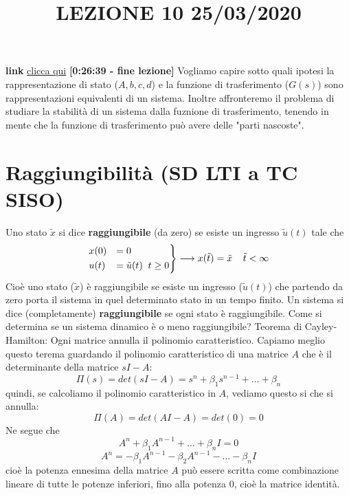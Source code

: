 \newpage
\title{LEZIONE 10 25/03/2020}\newline
\textbf{link} \href{https://web.microsoftstream.com/video/562a82e0-19cc-4f81-9183-eee77c9c45a4?list=user&userId=faa91214-a6f5-40d7-8875-253fd49b8ce1}{clicca qui} \;\;\textbf{[0:26:39 - fine lezione]}\newline
\newline
Vogliamo capire sotto quali ipotesi la rappresentazione di stato ($A, b, c, d$) e la funzione di trasferimento ($G(s)$) sono rappresentazioni equivalenti di un sistema. Inoltre affronteremo il problema di studiare la stabilità di un sistema dalla fuznione di trasferimento, tenendo in mente che la funzione di trasferimento può avere delle "parti nascoste".
\section{Raggiungibilità (SD LTI a TC SISO)}
Uno stato $\tilde{x}$ si dice \textbf{raggiungibile} (da zero) se esiste un ingresso $\tilde{u}(t)$ tale che 
\[
    \begin{rcases}
        x(0) &= 0 \\
        u(t) &= \tilde{u}(t) \;\; t \geq 0
    \end{rcases} \longrightarrow x(\tilde{t}) = \tilde{x}  \;\;\;\; \tilde{t}< \infty
\]
Cioè uno stato ($\tilde{x}$) è raggiungibile se esiste un ingresso ($\tilde{u}(t)$) che partendo da zero porta il sistema in quel determinato stato in un tempo finito.\newline
\newline
Un sistema si dice (completamente) \textbf{raggiungibile} se ogni stato è raggiungibile.\newline
\newline
Come si determina se un sistema dinamico è o meno raggiungibile?\newline
\newline
Teorema di Cayley-Hamilton: Ogni matrice annulla il polinomio caratteristico.\newline
Capiamo meglio questo terema guardando il polinomio caratteristico di una matrice $A$ che è il determinante della matrice $sI-A$:
\[
    \Pi(s) = det(sI-A) = s^n + \beta_1 s^{n-1} + \dots + \beta_n
\]
quindi, se calcoliamo il polinomio caratteristico in $A$, vediamo questo si che si annulla:
\[
    \Pi(A) = det(AI-A) = det(0) = 0
\]
Ne segue che
\[
    A^n + \beta_1 A^{n-1} + \dots + \beta_n I = 0
\]
\[
    A^n = -\beta_1 A^{n-1} - \beta_2 A^{n-1} - \dots - \beta_n I
\]
cioè la potenza ennesima della matrice $A$ può essere scritta come combinazione lineare di tutte le potenze inferiori, fino alla potenza $0$, cioè la matrice identità.\newline
